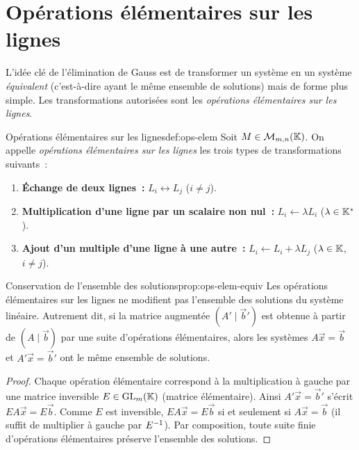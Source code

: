 \section{Opérations élémentaires sur les lignes}\label{sec:operations-elementaires}

L'idée clé de l'élimination de Gauss est de transformer un système en un
système \emph{équivalent} (c'est-à-dire ayant le même ensemble de solutions)
mais de forme plus simple. Les transformations autorisées sont les
\emph{opérations élémentaires sur les lignes}.

\begin{definition}{Opérations élémentaires sur les lignes}{def:ops-elem}
  Soit $M\in\mathcal{M}_{m,n}({\mathbb{K}})$. On appelle \emph{opérations élémentaires
  sur les lignes} les trois
  types de transformations suivants~:
  \begin{enumerate}[label=(\roman*)]
    \item \textbf{Échange de deux lignes~:}
      $L_i \leftrightarrow L_j$ \quad ($i\neq j$).
    \item \textbf{Multiplication d'une ligne par un scalaire non nul~:}%
      $L_i \leftarrow \lambda L_i$ \quad ($\lambda\in{\mathbb{K}}^{*}$).
    \item \textbf{Ajout d'un multiple d'une ligne à une autre~:}%
      $L_i \leftarrow L_i + \lambda L_j$ \quad ($\lambda\in{\mathbb{K}}$, $i\neq j$).
  \end{enumerate}
\end{definition}

\begin{proposition}{Conservation de l'ensemble des solutions}{prop:ops-elem-equiv}
  Les opérations élémentaires sur les lignes ne modifient pas l'ensemble
  des solutions du système linéaire. Autrement dit, si la matrice augmentée
  $(A'\mid\vec{b}')$ est obtenue à partir de $(A\mid\vec{b})$ par une suite
  d'opérations élémentaires, alors les systèmes $A\vec{x}=\vec{b}$ et
  $A'\vec{x}=\vec{b}'$ ont le même ensemble de solutions.
\end{proposition}

\begin{proof}
  Chaque opération élémentaire correspond à la multiplication à gauche par
  une matrice inversible $E\in\operatorname{GL}_{m}({\mathbb{K}})$ (matrice
  élémentaire). Ainsi $A'\vec{x}=\vec{b}'$ s'écrit $EA\vec{x}=E\vec{b}$.
  Comme $E$ est inversible, $EA\vec{x}=E\vec{b}$ si et seulement si
  $A\vec{x}=\vec{b}$ (il suffit de multiplier à gauche par ${E}^{-1}$).
  Par composition, toute suite finie d'opérations élémentaires préserve
  l'ensemble des solutions.
\end{proof}

